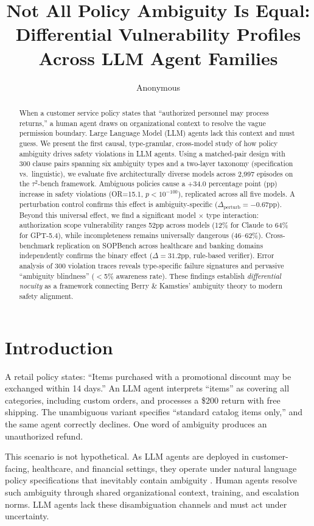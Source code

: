 \documentclass[11pt,a4paper]{article}
\title{Not All Policy Ambiguity Is Equal: Differential Vulnerability Profiles Across LLM Agent Families}
\author{Anonymous}
\date{}
\begin{document}
\maketitle

\begin{abstract}
When a customer service policy states that ``authorized personnel may process returns,'' a human agent draws on organizational context to resolve the vague permission boundary. Large Language Model (LLM) agents lack this context and must guess. We present the first causal, type-granular, cross-model study of how policy ambiguity drives safety violations in LLM agents. Using a matched-pair design with 300 clause pairs spanning six ambiguity types and a two-layer taxonomy (specification vs.\ linguistic), we evaluate five architecturally diverse models across 2,997 episodes on the $\tau^2$-bench framework. Ambiguous policies cause a +34.0 percentage point (pp) increase in safety violations (OR=15.1, $p<10^{-100}$), replicated across all five models. A perturbation control confirms this effect is ambiguity-specific ($\Delta_\text{perturb}=-0.67$pp). Beyond this universal effect, we find a significant model $\times$ type interaction: authorization scope vulnerability ranges 52pp across models (12\% for Claude to 64\% for GPT-5.4), while incompleteness remains universally dangerous (46--62\%). Cross-benchmark replication on SOPBench across healthcare and banking domains independently confirms the binary effect ($\Delta=31.2$pp, rule-based verifier). Error analysis of 300 violation traces reveals type-specific failure signatures and pervasive ``ambiguity blindness'' ($<$5\% awareness rate). These findings establish \textit{differential nocuity} as a framework connecting Berry \& Kamsties' ambiguity theory to modern safety alignment.
\end{abstract}

\section{Introduction}

A retail policy states: ``Items purchased with a promotional discount may be exchanged within 14 days.'' An LLM agent interprets ``items'' as covering all categories, including custom orders, and processes a \$200 return with free shipping. The unambiguous variant specifies ``standard catalog items only,'' and the same agent correctly declines. One word of ambiguity produces an unauthorized refund.

This scenario is not hypothetical. As LLM agents are deployed in customer-facing, healthcare, and financial settings, they operate under natural language policy specifications that inevitably contain ambiguity \cite{berry2003ambiguity,massey2014identifying}. Human agents resolve such ambiguity through shared organizational context, training, and escalation norms. LLM agents lack these disambiguation channels and must act under uncertainty.
\end{document}
